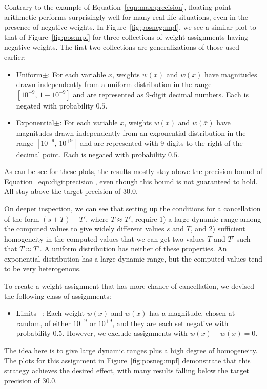 \documentclass[letterpaper,USenglish,cleveref, autoref, thm-restate]{lipics-v2021}
\newcommand{\obar}[1]{\overline{#1}}
\begin{document}
Contrary to the example of
Equation~\ref{eqn:max:precision},
floating-point arithmetic performs surprisingly well for
many real-life
situations, even in the presence of negative weights.
In Figure~\ref{fig:posneg:mpf}, we see a similar plot to that of Figure~\ref{fig:pos:mpf} for
three collections of weight assignments having negative weights.  The first two collections are generalizations of those used earlier:
\begin{itemize}
\item \textsf{Uniform$\pm$}: For each variable $x$, weights $w(x)$ and $w(\obar{x})$ have magnitudes drawn independently
from a uniform distribution in the range  $[10^{-9},\,1-10^{-9}]$ and are represented as 9-digit decimal numbers.  Each is negated with probability $0.5$.
\item \textsf{Exponential$\pm$}: For each variable $x$, weights $w(x)$ and $w(\obar{x})$ have magnitudes
  drawn independently from an exponential distribution in the range $[10^{-9},\,10^{+9}]$ and are represented with 9-digits to the right of the decimal point.  Each is negated with probability $0.5$.
\end{itemize}
As can be see for these plots, the results mostly stay above the precision bound of Equation~\ref{eqn:digitprecision},
even though this bound is not guaranteed to hold.  All stay above the target precision of $30.0$.

On deeper inspection, we can see that setting up the conditions for a
cancellation of the form $(s + T) - T'$, where $T \approx T'$, require
1) a large dynamic range among the computed values to give widely different values $s$ and $T$, and 2) sufficient
homogeneity in the computed values that we can get two values $T$ and
$T'$ such that $T \approx T'$.  A uniform distribution has neither of
these properties.  An exponential distribution has a large dynamic
range, but the computed values tend to be very heterogenous.

To create a weight assignment that has more chance of cancellation, we devised the following class of assignments:
\begin{itemize}
\item\textsf{Limits$\pm$}:  Each weight $w(x)$ and $w(\obar{x})$ has a magnitude, chosen at random, of either $10^{-9}$ or $10^{+9}$, and they are each set negative with probability $0.5$.
  However, we exclude assignments with $w(x) + w(\obar{x}) = 0$.
\end{itemize}
The idea here is to give large dynamic ranges plus a high degree of
homogeneity.  The plots for this assignment in
Figure~\ref{fig:posneg:mpf} demonstrate that this strategy achieves
the desired effect, with many results falling below the target precision of $30.0$.
\end{document}
